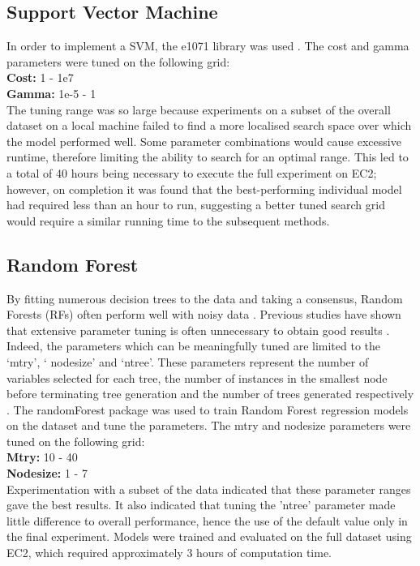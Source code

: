 \documentclass[journal]{IEEEtran}
\begin{document}
\subsection{Support Vector Machine}
In order to implement a SVM, the e1071 library was used \cite{Meyer2017}. The cost and gamma parameters were tuned on the following grid:\\
\textbf{Cost:} 1 - 1e7\\
\textbf{Gamma:} 1e-5 - 1\\
The tuning range was so large because experiments on a subset of the overall dataset on a local machine failed to find a more localised search space over which the model performed well. Some parameter combinations would cause excessive runtime, therefore limiting the ability to search for an optimal range. This led to a total of 40 hours being necessary to execute the full experiment on EC2; however, on completion it was found that the best-performing individual model had required less than an hour to run, suggesting a better tuned search grid would require a similar running time to the subsequent methods.
  


\subsection{Random Forest}
By fitting numerous decision trees to the data and taking a consensus, Random Forests (RFs) often perform well with noisy data \cite{Follecco2008}. Previous studies have shown that extensive parameter tuning is often unnecessary to obtain good results \cite{Prior2006}. Indeed, the parameters which can be meaningfully tuned are limited to the ‘mtry’, ‘ nodesize’ and  ‘ntree’. These parameters represent the number of variables selected for each tree, the number of instances in the smallest node before terminating tree generation and the number of trees generated respectively \cite{Brieman2015}.
The randomForest package \cite{Brieman2015} was used to train Random Forest regression models on the dataset and tune the parameters. The mtry and nodesize parameters were tuned on the following grid:\\
\textbf{Mtry:} 10 - 40\\
\textbf{Nodesize:} 1 - 7\\
Experimentation with a subset of the data indicated that these parameter ranges gave the best results. It also indicated that tuning the 'ntree' parameter made little difference to overall performance, hence the use of the default value only in the final experiment. Models were trained and evaluated on the full dataset using EC2, which required approximately 3 hours of computation time.  
\end{document}
